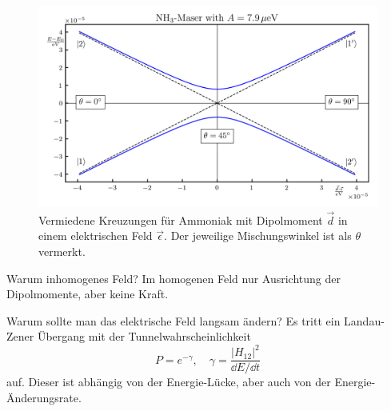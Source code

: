 \begin{figure}[!ht]
    \centering
    \includegraphics{img/AmmoniakALC.png}
    \caption{Vermiedene Kreuzungen für Ammoniak mit Dipolmoment $\Vec{d}$ in einem elektrischen Feld $\Vec{\epsilon}$.
    Der jeweilige Mischungswinkel ist als $\theta$ vermerkt.}
    \label{fig:AmmoniakALC}
\end{figure}

\begin{fquestion}{Warum inhomogenes Feld?}
    Im homogenen Feld nur Ausrichtung der Dipolmomente, aber keine Kraft.
\end{fquestion}

\begin{fquestion}{Warum sollte man das elektrische Feld langsam ändern?}
    Es tritt ein Landau-Zener Übergang mit der Tunnelwahrscheinlichkeit 
    \[P = e^{-\gamma}, \quad \gamma = \frac{|H_{12}|^2}{\dd E/\dd t}\]
    auf.
    Dieser ist abhängig von der Energie-Lücke, aber auch von der Energie-Änderungsrate.
\end{fquestion}





